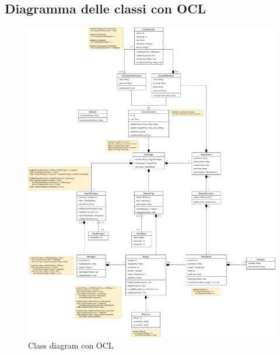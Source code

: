 \documentclass[a4paper,12pt]{article}
\begin{document}
\subsection{Diagramma delle classi con OCL}
\begin{figure}[H]
   \centering
   \includegraphics[width=1\textwidth] {D3/img/class_diagram_OCL.png}
    \caption{Class diagram con OCL}
\end{figure}
\end{document}
